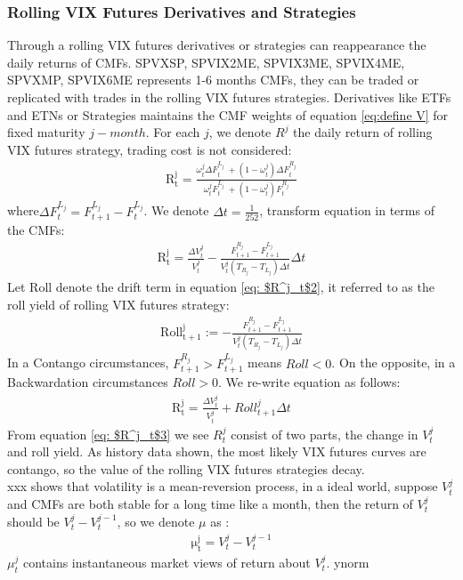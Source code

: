 \documentclass[10pt,letterpaper]{article}
\begin{document}
\subsubsection*{Rolling VIX Futures Derivatives and Strategies}
Through a rolling VIX futures derivatives or strategies can reappearance the daily returns of CMFs.
SPVXSP, SPVIX2ME, SPVIX3ME, SPVIX4ME, SPVXMP, SPVIX6ME represents 1-6 months CMFs, they can be traded or replicated with trades in the rolling VIX futures strategies.
Derivatives like ETFs and ETNs or Strategies maintains the CMF weights of equation \ref{eq:define V} for fixed maturity $j-month$. For each $j$, we denote $R^j$
the daily return of rolling VIX futures strategy, trading cost is not considered:
\begin{eqnarray}
    \mathrm{R^j_t} = \frac{\omega^j_t{\Delta}F^{L_j}_t\ + (1 - \omega^j_t){\Delta}F^{R_j}_t}{\omega^j_tF^{L_j}_t\ + (1 - \omega^j_t)F^{R_j}_t}
\end{eqnarray}
where${\Delta}F^{L_j}_t = F^{L_j}_{t+1} - F^{L_j}_t$. We denote ${\Delta}t = \frac{1}{252}$, transform equation in terms of the CMFs:
\begin{eqnarray}
\label{eq: $R^j_t$2}
    \mathrm{R^j_t} = \frac{{\Delta}V^j_t}{V^j_t} - \frac{F^{R_j}_{t+1} - F^{L_j}_{t+1}}{V^j_t(T_{R_j} - T_{L_j}){\Delta}t}{\Delta}t
\end{eqnarray}
Let Roll denote the drift term in equation \ref{eq: $R^j_t$2}, it referred to as the roll yield of rolling VIX futures strategy:
\begin{eqnarray}
    \mathrm{Roll^j_{t+1}} := - \frac{F^{R_j}_{t+1} - F^{L_j}_{t+1}}{V^j_t(T_{R_j} - T_{L_j}){\Delta}t}
\end{eqnarray}
In a Contango circumstances, $F^{R_j}_{t+1} > F^{L_j}_{t+1}$ means $Roll < 0$. On the opposite, in a Backwardation circumstances $Roll > 0$.
We re-write equation as follows:
\begin{eqnarray}
\label{eq: $R^j_t$3}
    \mathrm{R^j_t} = \frac{{\Delta}V^j_t}{V^j_t} + Roll^j_{t+1}{\Delta}t
\end{eqnarray}
From equation \ref{eq: $R^j_t$3} we see $R^j_t$ consist of two parts, the change in $V^j_t$ and roll yield. As history data shown, the most likely VIX futures
curves are contango, so the value of the rolling VIX futures strategies decay.
\\xxx shows that volatility is a mean-reversion process, in a ideal world, suppose $V^j_t$ and CMFs are both stable for a long time like a month, then
the return of $V^j_t$ should be $V^j_t - V^{j-1}_t$, so we denote $\mu$ as :
\begin{eqnarray}
\label{eq: mu}
    \mathrm{\mu^j_t} = V^j_t - V^{j-1}_t
\end{eqnarray}
$\mu^j_t$ contains instantaneous market views of return about $V^j_t$.
ynorm
\end{document}

